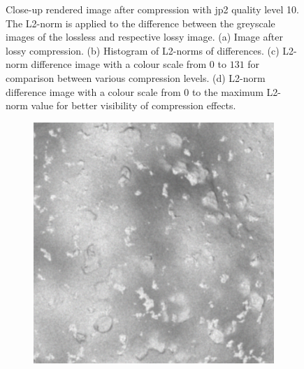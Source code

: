 \begin{figure}[htb]
\begin{subfigure}[b]{0.48\textwidth}
        \caption{}
        \label{fig:img_quality_comp_jp2_10_center_diff_rel}
    \end{subfigure}
    \caption{Close-up rendered image after compression with \gls{jp2} quality level 10. The L2-norm is applied to the difference between the greyscale images of the lossless and respective lossy image. (a) Image after lossy compression. (b) Histogram of L2-norms of differences. (c) L2-norm difference image with a colour scale from $0$ to $131$ for comparison between various compression levels. (d) L2-norm difference image with a colour scale from $0$ to the maximum L2-norm value for better visibility of compression effects.}
    \label{fig:img_quality_comp_jp2_10_center}
\end{figure}

\begin{figure}[htb]
    \centering
    \begin{subfigure}[b]{0.48\textwidth}
        \centering
        \includegraphics[width=\textwidth]{doc/thesis/0_figures/compare_quality/set1/jp2_100_center.png}
        \caption{}
        \label{fig:img_quality_comp_jp2_100_center_orig}
    \end{subfigure}
    \begin{subfigure}[b]{0.48\textwidth}
        \centering

\end{subfigure}
\end{figure}
